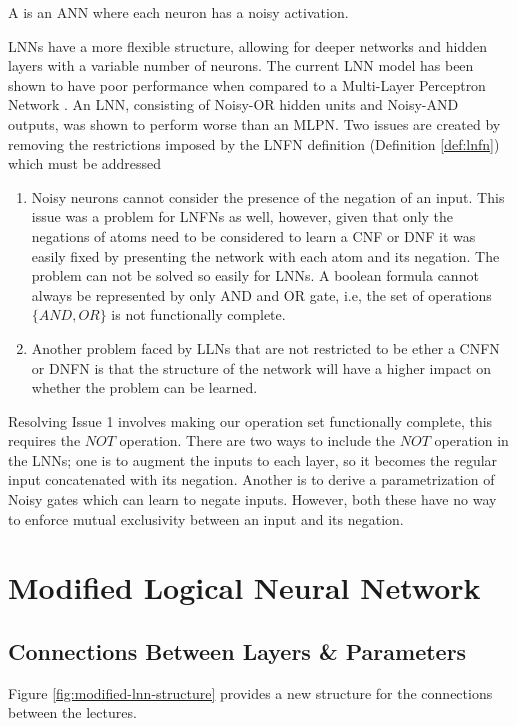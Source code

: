 \begin{definition}
	A  is an ANN where each neuron has a noisy activation.
\end{definition}

LNNs have a more flexible structure, allowing for deeper networks and hidden layers with a variable number of neurons. The current LNN model has been shown to have poor performance when compared to a Multi-Layer Perceptron Network \cite{LearningLogicalActivations}. An LNN, consisting of Noisy-OR hidden units and Noisy-AND outputs, was shown to perform worse than an MLPN. Two issues are created by removing the restrictions imposed by the LNFN definition (Definition \ref{def:lnfn}) which must be addressed 

\begin{enumerate}
	\item Noisy neurons cannot consider the presence of the negation of an input. This issue was a problem for LNFNs as well, however, given that only the negations of atoms need to be considered to learn a CNF or DNF it was easily fixed by presenting the network with each atom and its negation. The problem can not be solved so easily for LNNs. A boolean formula cannot always be represented by only AND and OR gate, i.e, the set of operations $\{AND, OR\}$ is not functionally complete. 
	
	\item Another problem faced by LLNs that are not restricted to be ether a CNFN or DNFN is that the structure of the network will have a higher impact on whether the problem can be learned. 
\end{enumerate}

Resolving Issue 1 involves making our operation set functionally complete, this requires the $NOT$ operation. There are two ways to include the $NOT$ operation in the LNNs; one is to augment the inputs to each layer, so it becomes the regular input concatenated with its negation. Another is to derive a parametrization of Noisy gates which can learn to negate inputs. However, both these have no way to enforce mutual exclusivity between an input and its negation.

\section{Modified Logical Neural Network} \label{sec:modified-lnn}
\subsection{Connections Between Layers \& Parameters}
Figure \ref{fig:modified-lnn-structure} provides a new structure for the connections between the lectures.

